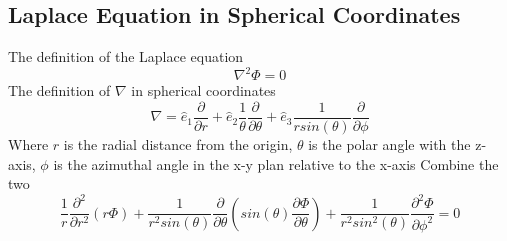 \documentclass[12pt]{article}
\begin{document}
    \subsection{Laplace Equation in Spherical Coordinates} \label{Appendix2}
        The definition of the Laplace equation
        \begin{equation} \label{eq: a2-1}
            \nabla^2 \Phi = 0
        \end{equation}
        The definition of $\nabla$ in spherical coordinates
        \begin{equation} \label{eq: a2-2}
            \nabla = \hat{e}_1 \frac{\partial}{\partial r} + \hat{e}_2 \frac{1}{\theta} \frac{\partial}{\partial \theta} + \hat{e}_3 \frac{1}{r sin(\theta)}\frac{\partial}{\partial \phi}
        \end{equation}
        Where $r$ is the radial distance from the origin, $\theta$ is the polar angle with the z-axis, $\phi$ is the azimuthal angle in the x-y plan relative to the x-axis
        \newline Combine the two
        \begin{equation} \label{eq: a2-3}
            \frac{1}{r} \frac{\partial^2}{\partial r^2} (r \Phi) + \frac{1}{r^2 sin(\theta)} \frac{\partial}{\partial \theta} \left(sin(\theta) \frac{\partial \Phi}{\partial \theta} \right) + \frac{1}{r^2 sin^2(\theta)} \frac{\partial^2 \Phi}{\partial \phi^2} = 0
        \end{equation}
        
\end{document}
